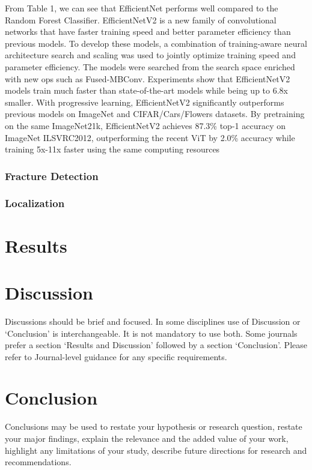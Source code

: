\documentclass[pdflatex,sn-mathphys]{sn-jnl}%
\theoremstyle{thmstyleone}%
\theoremstyle{thmstyletwo}%
\theoremstyle{thmstylethree}%
\begin{document}
From Table 1, we can see that EfficientNet performs well compared to the Random Forest Classifier. EfficientNetV2 is a new family of convolutional networks that have faster training speed and better parameter efficiency than previous models. To develop these models, a combination of training-aware neural architecture search and scaling was used to jointly optimize training speed and parameter efficiency. The models were searched from the search space enriched with new ops such as Fused-MBConv\cite{Fused-MBConv}. Experiments show that EfficientNetV2 models train much faster than state-of-the-art models while being up to 6.8x smaller. With progressive learning, EfficientNetV2 significantly outperforms previous models on ImageNet and CIFAR/Cars/Flowers datasets. By pretraining on the same ImageNet21k, EfficientNetV2 achieves 87.3\% top-1 accuracy on ImageNet ILSVRC2012, outperforming the recent ViT by 2.0\% accuracy while training 5x-11x faster using the same computing resources

\subsubsection{Fracture Detection}\label{subsubsec2}

\subsubsection{Localization}\label{subsubsec3}

\section{Results}\label{sec3}

\section{Discussion}\label{sec12}

Discussions should be brief and focused. In some disciplines use of Discussion or `Conclusion' is interchangeable. It is not mandatory to use both. Some journals prefer a section `Results and Discussion' followed by a section `Conclusion'. Please refer to Journal-level guidance for any specific requirements. 

\section{Conclusion}\label{sec13}

Conclusions may be used to restate your hypothesis or research question, restate your major findings, explain the relevance and the added value of your work, highlight any limitations of your study, describe future directions for research and recommendations. 
\end{document}

